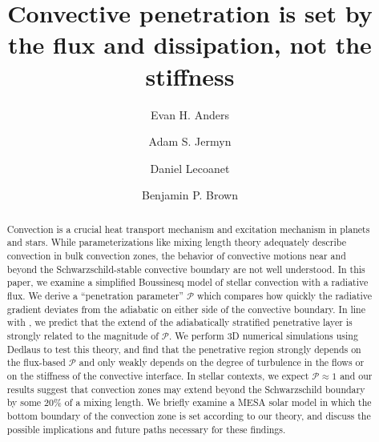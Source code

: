 \documentclass{aastex631}
\begin{document}
\title{Convective penetration is set by the flux and dissipation, not the stiffness}
\author[0000-0002-3433-4733]{Evan H. Anders}
\author[0000-0001-5048-9973]{Adam S. Jermyn}
\author[0000-0002-7635-9728]{Daniel Lecoanet}
\author[0000-0001-8935-219X]{Benjamin P. Brown}


\begin{abstract}
Convection is a crucial heat transport mechanism and excitation mechanism in planets and stars.
While parameterizations like mixing length theory adequately describe convection in bulk convection zones, the behavior of convective motions near and beyond the Schwarzschild-stable convective boundary are not well understood.
In this paper, we examine a simplified Boussinesq model of stellar convection with a radiative flux.
We derive a ``penetration parameter'' $\mathcal{P}$ which compares how quickly the radiative gradient deviates from the adiabatic on either side of the convective boundary.
In line with \citet{zahn1991}, we predict that the extend of the adiabatically stratified penetrative layer is strongly related to the magnitude of $\mathcal{P}$.
We perform 3D numerical simulations using Dedlaus to test this theory, and find that the penetrative region strongly depends on the flux-based $\mathcal{P}$ and only weakly depends on the degree of turbulence in the flows or on the stiffness of the convective interface.
In stellar contexts, we expect $\mathcal{P} \approx 1$ and our results suggest that convection zones may extend beyond the Schwarzschild boundary by some 20\% of a mixing length.
We briefly examine a MESA solar model in which the bottom boundary of the convection zone is set according to our theory, and discuss the possible implications and future paths necessary for these findings.
\end{abstract}



\end{document}
